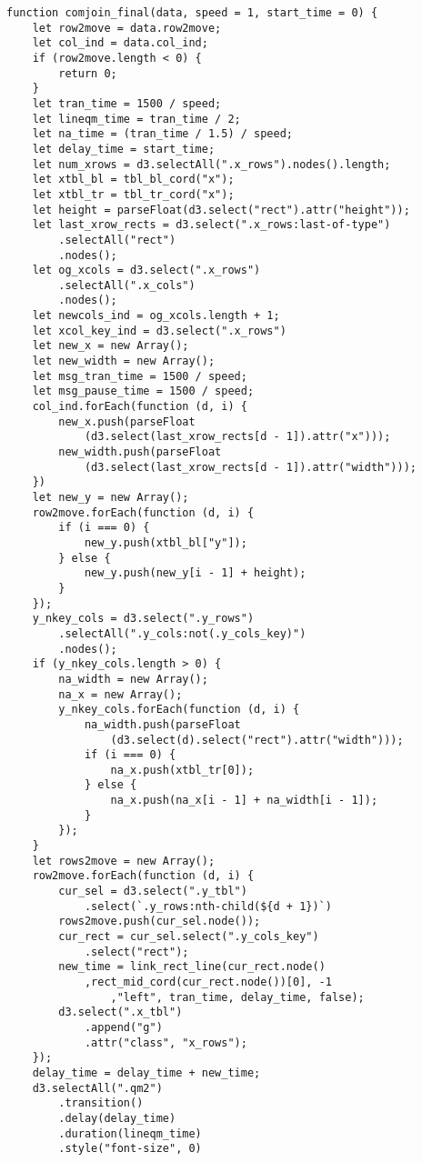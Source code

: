 \begin{lstlisting}
function comjoin_final(data, speed = 1, start_time = 0) {
    let row2move = data.row2move;
    let col_ind = data.col_ind;
    if (row2move.length < 0) {
        return 0;
    }
    let tran_time = 1500 / speed;
    let lineqm_time = tran_time / 2;
    let na_time = (tran_time / 1.5) / speed;
    let delay_time = start_time;
    let num_xrows = d3.selectAll(".x_rows").nodes().length;
    let xtbl_bl = tbl_bl_cord("x");
    let xtbl_tr = tbl_tr_cord("x");
    let height = parseFloat(d3.select("rect").attr("height"));
    let last_xrow_rects = d3.select(".x_rows:last-of-type")
        .selectAll("rect")
        .nodes();
    let og_xcols = d3.select(".x_rows")
        .selectAll(".x_cols")
        .nodes();
    let newcols_ind = og_xcols.length + 1;
    let xcol_key_ind = d3.select(".x_rows")
    let new_x = new Array();
    let new_width = new Array();
    let msg_tran_time = 1500 / speed;
    let msg_pause_time = 1500 / speed;
    col_ind.forEach(function (d, i) {
        new_x.push(parseFloat
            (d3.select(last_xrow_rects[d - 1]).attr("x")));
        new_width.push(parseFloat
            (d3.select(last_xrow_rects[d - 1]).attr("width")));
    })
    let new_y = new Array();
    row2move.forEach(function (d, i) {
        if (i === 0) {
            new_y.push(xtbl_bl["y"]);
        } else {
            new_y.push(new_y[i - 1] + height);
        }
    });
    y_nkey_cols = d3.select(".y_rows")
        .selectAll(".y_cols:not(.y_cols_key)")
        .nodes();
    if (y_nkey_cols.length > 0) {
        na_width = new Array();
        na_x = new Array();
        y_nkey_cols.forEach(function (d, i) {
            na_width.push(parseFloat
                (d3.select(d).select("rect").attr("width")));
            if (i === 0) {
                na_x.push(xtbl_tr[0]);
            } else {
                na_x.push(na_x[i - 1] + na_width[i - 1]);
            }
        });
    }
    let rows2move = new Array();
    row2move.forEach(function (d, i) {
        cur_sel = d3.select(".y_tbl")
            .select(`.y_rows:nth-child(${d + 1})`)
        rows2move.push(cur_sel.node());
        cur_rect = cur_sel.select(".y_cols_key")
            .select("rect");
        new_time = link_rect_line(cur_rect.node()
            ,rect_mid_cord(cur_rect.node())[0], -1
                ,"left", tran_time, delay_time, false);
        d3.select(".x_tbl")
            .append("g")
            .attr("class", "x_rows");
    });
    delay_time = delay_time + new_time;
    d3.selectAll(".qm2")
        .transition()
        .delay(delay_time)
        .duration(lineqm_time)
        .style("font-size", 0)

\end{lstlisting}
